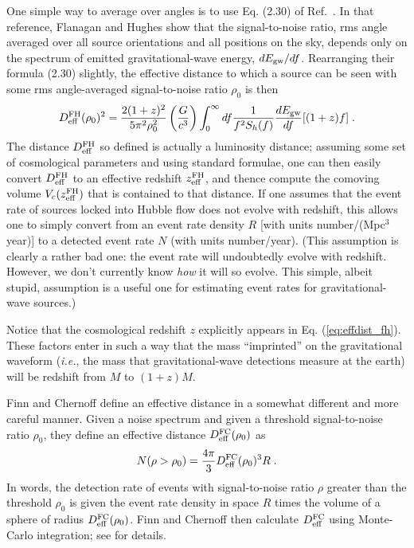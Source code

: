 One simple way to average over angles is to use Eq. (2.30) of Ref.\
{\cite{flanhughes1}}.  In that reference, Flanagan and Hughes show
that the signal-to-noise ratio, rms angle averaged over all source
orientations and all positions on the sky, depends only on the
spectrum of emitted gravitational-wave energy, $dE_{\rm gw}/df$.
Rearranging their formula (2.30) slightly, the effective distance to
which a source can be seen with some rms angle-averaged
signal-to-noise ratio $\rho_0$ is then
\begin{equation}
D^{\rm FH}_{\rm eff}(\rho_0)^2 = 
 {2(1+z)^2\over5\pi^2\rho_0^2}
\left( {G \over c^3} \right) \int_0^\infty df {1\over f^2 S_h(f)}{dE_{\rm gw}\over df}[(1+z)f]\;.
\label{eq:effdist_fh}
\end{equation}
The distance $D^{\rm FH}_{\rm eff}$ so defined is actually a
luminosity distance; assuming some set of cosmological parameters and
using standard formulae, one can then easily convert $D^{\rm FH}_{\rm
eff}$ to an effective redshift $z^{\rm FH}_{\rm eff}$, and thence
compute the comoving volume $V_c(z^{\rm FH}_{\rm eff})$ that is
contained to that distance.  If one assumes that the event rate of
sources locked into Hubble flow does not evolve with redshift, this
allows one to simply convert from an event rate density $R$ [with
units number/(Mpc$^3$ year)] to a detected event rate $N$ (with units
number/year).  (This assumption is clearly a rather bad one: the event
rate will undoubtedly evolve with redshift.  However, we don't
currently know {\it how} it will so evolve.  This simple, albeit
stupid, assumption is a useful one for estimating event rates for
gravitational-wave sources.)

Notice that the cosmological redshift $z$ explicitly appears in
Eq. (\ref{eq:effdist_fh}).  These factors enter in such a way that the
mass ``imprinted'' on the gravitational waveform ({\it i.e.}, the mass
that gravitational-wave detections measure at the earth) will be
redshift from $M$ to $(1+z)M$.

Finn and Chernoff {\cite{finnandchernoff}} define an effective
distance in a somewhat different and more careful manner.
Given a noise spectrum and given a threshold signal-to-noise ratio
$\rho_0$, they define an effective distance $D^{\rm FC}_{\rm
eff}(\rho_0)$ as
\begin{equation}
N(\rho > \rho_0)  = {4\pi\over3} D^{\rm FC}_{\rm eff}(\rho_0)^3 R\;.
\label{eq:effdist_fc}
\end{equation}
In words, the detection rate of events with signal-to-noise ratio
$\rho$ greater than the threshold $\rho_0$ is given the event rate
density in space $R$ times the volume of a sphere of radius $D^{\rm
FC}_{\rm eff}(\rho_0)$.  Finn and Chernoff then calculate $D^{\rm
FC}_{\rm eff}$ using Monte-Carlo integration; see
{\cite{finnandchernoff}} for details.


